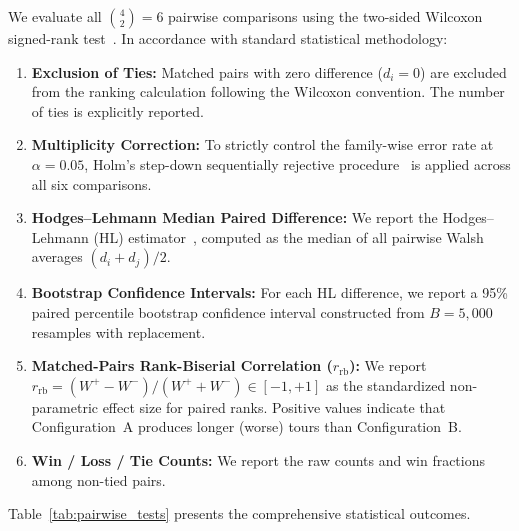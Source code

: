 \documentclass[10pt,a4paper]{article}
\begin{document}
We evaluate all $\binom{4}{2} = 6$ pairwise comparisons using the two-sided Wilcoxon signed-rank test~\cite{wilcoxon1945individual}. In accordance with standard statistical methodology:
\begin{enumerate}
    \item \textbf{Exclusion of Ties:} Matched pairs with zero difference ($d_i = 0$) are excluded from the ranking calculation following the Wilcoxon convention. The number of ties is explicitly reported.
    \item \textbf{Multiplicity Correction:} To strictly control the family-wise error rate at $\alpha = 0.05$, Holm's step-down sequentially rejective procedure~\cite{holm1979simple} is applied across all six comparisons.
    \item \textbf{Hodges--Lehmann Median Paired Difference:} We report the Hodges--Lehmann (HL) estimator~\cite{hodges1963estimates}, computed as the median of all pairwise Walsh averages $(d_i + d_j)/2$.
    \item \textbf{Bootstrap Confidence Intervals:} For each HL difference, we report a 95\% paired percentile bootstrap confidence interval constructed from $B = 5{,}000$ resamples with replacement.
    \item \textbf{Matched-Pairs Rank-Biserial Correlation ($r_{\text{rb}}$):} We report $r_{\text{rb}} = (W^+ - W^-)/(W^+ + W^-) \in [-1, +1]$ as the standardized non-parametric effect size for paired ranks. Positive values indicate that Configuration~A produces longer (worse) tours than Configuration~B.
    \item \textbf{Win / Loss / Tie Counts:} We report the raw counts and win fractions among non-tied pairs.
\end{enumerate}

Table~\ref{tab:pairwise_tests} presents the comprehensive statistical outcomes.
\end{document}
